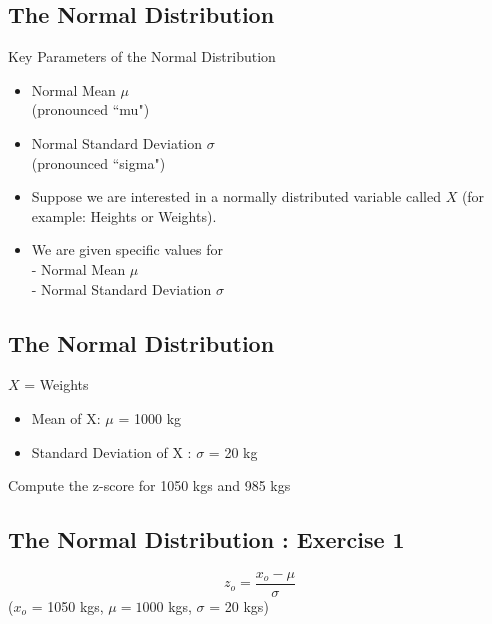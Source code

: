 \documentclass[]{report}
\begin{document}
	
	
	
	
	\subsection{The Normal Distribution}
	
	{
		\normalsize
		Key Parameters of the Normal Distribution
		\begin{itemize}
			\item Normal Mean $\mu$ \\(pronounced ``mu")
			\item Normal Standard Deviation $\sigma$ \\ (pronounced ``sigma")
		\end{itemize}
		
		\begin{itemize}
			\item Suppose we are interested in a normally distributed variable called $X$ (for example: Heights or Weights).
			\item We are given specific values for 
			\\  - Normal Mean $\mu$ 
			\\  - Normal Standard Deviation $\sigma$ 
		\end{itemize}
	}
	
	
	
	
	
	\subsection{The Normal Distribution}
	
	
	
	$X$ = Weights
	\bigskip
	\begin{itemize}
		\item Mean of X:  $\mu$ = 1000 kg 
		\item Standard Deviation of X : $\sigma$ = 20 kg
	\end{itemize}
	\bigskip
	
	Compute the z-score for 1050 kgs and 985 kgs
	
	
	
	\subsection{The Normal Distribution :  Exercise 1}

	\[ z_o = \frac{x_o - \mu}{\sigma}  \]
	($x_o$ = 1050 kgs, $\mu = 1000$ kgs, $\sigma$ = 20 kgs)
	
\end{document}
